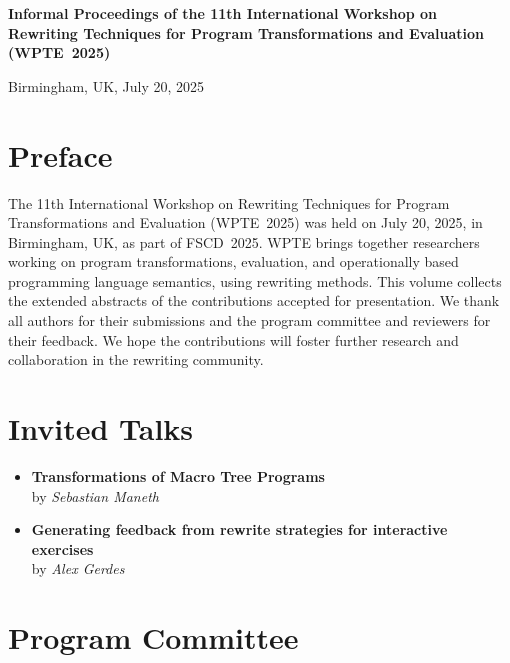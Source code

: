 \documentclass[a4paper,11pt]{article}
\begin{document}
\begin{titlepage}
\centering
{\LARGE \textbf{Informal Proceedings of the 11th International Workshop on Rewriting Techniques for Program Transformations and Evaluation (WPTE~2025)}\par}
\vspace{1cm}
{\Large Birmingham, UK, July 20, 2025\par}

\vfill

\section*{Preface}

The 11th International Workshop on Rewriting Techniques for Program Transformations and Evaluation (WPTE~2025) was held on July 20, 2025, in Birmingham, UK, as part of FSCD~2025.
WPTE brings together researchers working on program transformations, evaluation, and operationally based programming language semantics, using rewriting methods.
This volume collects the extended abstracts of the contributions accepted for presentation.
We thank all authors for their submissions and the program committee and reviewers for their feedback.
We hope the contributions will foster further research and collaboration in the rewriting community.

\vfill
\vfill

\section*{Invited Talks}

\begin{itemize}
\item
  \textbf{Transformations of Macro Tree Programs}\\
  \protect\hspace{1.5em}
  by {\itshape Sebastian Maneth}
\item
  \textbf{Generating feedback from rewrite strategies for interactive exercises}\\
  \protect\hspace{1.5em}
  by {\itshape Alex Gerdes}
\end{itemize}

\vfill

\section*{Program Committee}


\end{titlepage}
\end{document}
